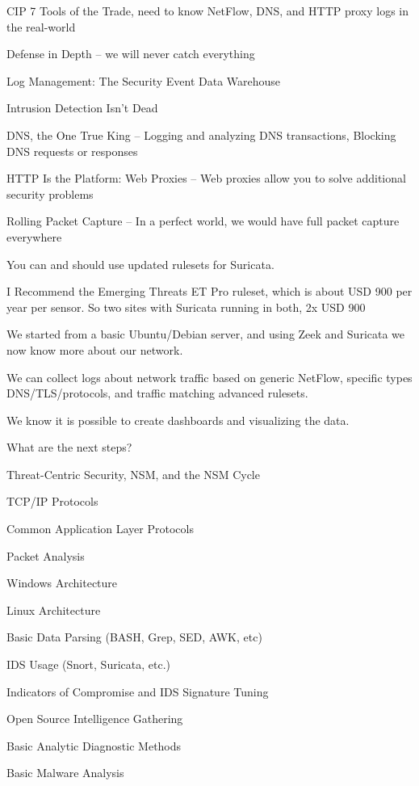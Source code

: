 \documentclass[Screen16to9,17pt]{foils}
\begin{document}
\begin{list1}
\item CIP 7 Tools of the Trade, need to know NetFlow, DNS, and HTTP proxy logs in the real-world
\begin{list2}
\item Defense in Depth -- we will never catch everything
\item Log Management: The Security Event Data Warehouse
\item Intrusion Detection Isn’t Dead
\item DNS, the One True King -- Logging and analyzing DNS transactions, Blocking DNS requests or responses
\item HTTP Is the Platform: Web Proxies -- Web proxies allow you to solve additional security problems
\item Rolling Packet Capture -- In a perfect world, we would have full packet capture everywhere
\end{list2}
\end{list1}



You can and should use updated rulesets for Suricata.

I Recommend the Emerging Threats ET Pro ruleset, which is about USD 900 per year per sensor. So two sites with Suricata running in both, 2x USD 900


We started from a basic Ubuntu/Debian server, and using Zeek and Suricata we now know more about our network.

We can collect logs about network traffic based on generic NetFlow, specific types DNS/TLS/protocols, and traffic matching advanced rulesets.

We know it is possible to create dashboards and visualizing the data.

What are the next steps?






\begin{list2}\small
\item Threat-Centric Security, NSM, and the NSM Cycle
\item TCP/IP Protocols
\item Common Application Layer Protocols
\item Packet Analysis
\item Windows Architecture
\item Linux Architecture
\item Basic Data Parsing (BASH, Grep, SED, AWK, etc)
\item IDS Usage (Snort, Suricata, etc.)
\item Indicators of Compromise and IDS Signature Tuning
\item Open Source Intelligence Gathering
\item Basic Analytic Diagnostic Methods
\item Basic Malware Analysis
\end{list2}
\end{document}
